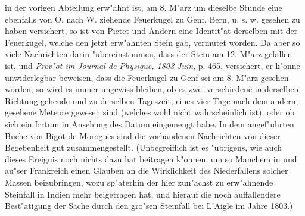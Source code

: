 \documentclass[a4paper, 11pt, oneside, polutonikogreek, german]{article}
\begin{document}
in der vorigen Abteilung erw"ahnt ist, am 8. M"arz um dieselbe Stunde eine ebenfalls von O. nach W. ziehende Feuerkugel zu Genf, Bern, u. s. w. gesehen zu haben versichert, so ist von Pictet und Andern eine Identit"at derselben mit der Feuerkugel, welche den jetzt erw"ahnten Stein gab, vermutet worden. Da aber so viele Nachrichten darin "ubereinstimmen, dass der Stein am 12. M"arz gefallen ist, und \emph{Prev"ot im Journal de Physique, 1803 Juin}, p. 465, versichert, er k"onne unwiderlegbar beweisen, dass die Feuerkugel zu Genf sei am 8. M"arz gesehen worden, so wird es immer ungewiss bleiben, ob es zwei verschiedene in derselben Richtung gehende und zu derselben Tageszeit, eines vier Tage nach dem andern, gesehene Meteore gewesen sind (welches wohl nicht wahrscheinlich ist), oder ob sich ein Irrtum in Ansehung des Datum eingemengt habe. In dem angef"uhrten Buche von Bigot de Morogues sind die vorhandenen Nachrichten von dieser Begebenheit gut zusammengestellt. (Unbegreiflich ist es "ubrigens, wie auch dieses Ereignis noch nichts dazu hat beitragen k"onnen, um so Manchem in und au"ser Frankreich einen Glauben an die Wirklichkeit des Niederfallens solcher Massen beizubringen, wozu sp"aterhin der hier zun"achst zu erw"ahnende Steinfall in Indien mehr beigetragen hat, und hierauf die noch auffallendere Best"atigung der Sache durch den gro"sen Steinfall bei L'Aigle im Jahre 1803.)
\end{document}
